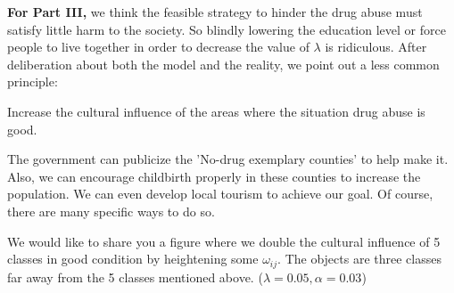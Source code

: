 \documentclass{mcmthesis}
\begin{document}
\textbf{For Part III,} we think the feasible strategy to hinder the drug abuse must satisfy little harm to the society. So blindly lowering the education level or force people to live together in order to decrease the value of $\lambda$ is ridiculous. After deliberation about both the model and the reality, we point out a less common principle:
\begin{center}
	Increase the cultural influence of the areas where the situation drug abuse is good.
\end{center}

The government can publicize the 'No-drug exemplary counties' to help make it. Also, we can encourage childbirth properly in these counties to increase the population. We can even develop local tourism to achieve our goal. Of course, there are many specific ways to do so.

We would like to share you a figure where we double the cultural influence of 5 classes in good condition by heightening some $\omega_{ij}$. The objects are three classes far away from the 5 classes mentioned above. ($\lambda=0.05, \alpha=0.03$)
\end{document}
